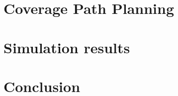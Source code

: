 \documentclass[a4paper,12pt, openright, twoside]{report}
\begin{document}
\chapter{Coverage Path Planning} %
\label{cha:coverage_path_planning}


\chapter{Simulation results} %
\label{sec:simulation_results}


\chapter{Conclusion} %
\label{cha:conclusion}







\begin{appendices}





\end{appendices}

\pagebreak
\listoffigures
\listoftables
\lstlistoflistings
\printindex

\end{document}
